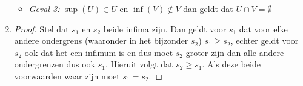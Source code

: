 \documentclass{article}
\newcommand{\tx}[1]{\text{#1}}
\newcommand{\en}{\tx{ en }}
\begin{document}
\begin{enumerate}[label=\arabic*]
\begin{itemize}
                  \item \emph{Geval 3:} $\sup(U) \in U \en \inf(V) \notin V$ dan geldt dat $U \cap V = \emptyset$
            \end{itemize}
      \item
            \begin{proof}
                  Stel dat $s_1 \en s_2$ beide infima zijn. Dan geldt voor $s_1$ dat voor elke andere ondergrens
                  (waaronder in het bijzonder $s_2$)
                  $s_1 \geq s_2$, echter geldt voor $s_2$ ook dat het een infimum is en dus
                  moet $s_2$ groter zijn dan alle andere ondergrenzen dus ook $s_1$. Hieruit volgt dat $s_2 \geq s_1$.
                  Als deze beide voorwaarden waar zijn moet $s_1 = s_2$.
            \end{proof}

\end{enumerate}
\end{document}
